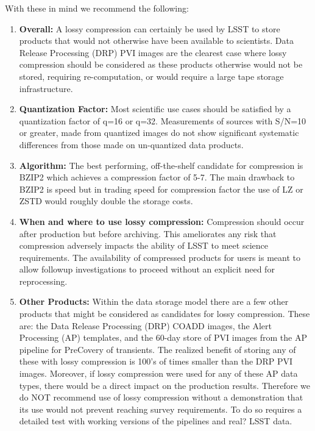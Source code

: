 With these in mind we recommend the following:
\begin{enumerate}
\item {\bf Overall:} A lossy compression can certainly be used by LSST to store products that would 
not otherwise have been available to scientists. Data Release Processing (DRP) PVI images are the 
clearest case where lossy compression should be considered as these products otherwise would not be stored, 
requiring re-computation, or would require a large tape storage infrastructure. 

\item {\bf Quantization Factor:} Most scientific use cases should be satisfied by a quantization 
factor of q=16 or q=32.  Measurements of sources with S/N=10 or greater, made from quantized images 
do not show significant systematic differences from those made on un-quantized data products.  

\item {\bf Algorithm:} The best performing, off-the-shelf candidate for compression is BZIP2 which 
achieves a compression factor of 5-7.  The main drawback to BZIP2 is speed but in trading speed for 
compression factor the use of LZ or ZSTD would roughly double the storage costs.  

\item {\bf When and where to use lossy compression:}  Compression should occur after production
but before archiving.  This ameliorates any risk that compression adversely impacts the ability 
of LSST to meet science requirements.  The availability of compressed products for
users is meant to allow followup investigations to proceed without an explicit need for reprocessing.  

\item {\bf Other Products:} Within the data storage model there are a few other products that 
might be considered as candidates for lossy compression.  These are: the Data Release Processing
(DRP) COADD images, the Alert Processing (AP) templates, and the 60-day store of PVI images from 
the AP pipeline for PreCovery of transients.  The realized benefit of storing any of these with 
lossy compression is 100's of times smaller than the DRP PVI images.  Moreover, if lossy compression 
were used for any of these AP data types, there would be a direct impact on the production results.  
Therefore we do NOT recommend use of lossy compression without a demonstration that its use would 
not prevent reaching survey requirements.  To do so requires a detailed test with working versions
of the pipelines and real? LSST data. 


\end{enumerate}
